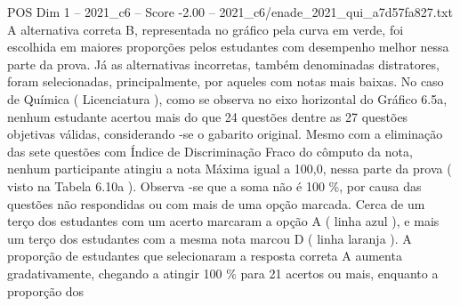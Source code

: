\begin{textsample}{POS Dim 1 – 2021\_c6 – Score -2.00 – 2021\_c6/enade\_2021\_qui\_a7d57fa827.txt}
A alternativa correta B, representada no gráfico pela curva em verde, foi escolhida em maiores proporções pelos estudantes com desempenho melhor nessa parte da prova.
Já as alternativas incorretas, também denominadas distratores, foram selecionadas, principalmente, por aqueles com notas mais baixas.
No caso de Química ( Licenciatura ), como se observa no eixo horizontal do Gráfico 6.5a, nenhum estudante acertou mais do que 24 questões dentre as 27 questões objetivas válidas, considerando -se o gabarito original.
Mesmo com a eliminação das sete questões com Índice de Discriminação Fraco do cômputo da nota, nenhum participante atingiu a nota Máxima igual a 100,0, nessa parte da prova ( visto na Tabela 6.10a ).
Observa -se que a soma não é 100 \%, por causa das questões não respondidas ou com mais de uma opção marcada.
Cerca de um terço dos estudantes com um acerto marcaram a opção A ( linha azul ), e mais um terço dos estudantes com a mesma nota marcou D ( linha laranja ).
A proporção de estudantes que selecionaram a resposta correta A aumenta gradativamente, chegando a atingir 100 \% para 21 acertos ou mais, enquanto a proporção dos

\end{textsample}
